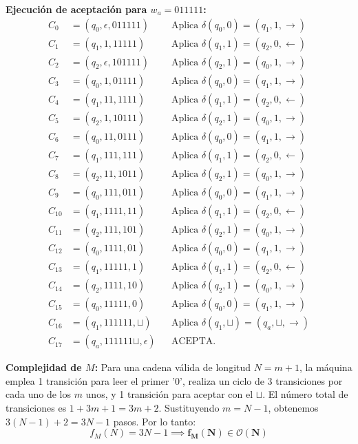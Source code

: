 \vspace{0.3cm}
\noindent\textbf{Ejecución de aceptación para $w_a = 011111$:}
\begin{align*}
    C_0 &= (q_0, \epsilon, 011111) && \text{Aplica } \delta(q_0, 0) = (q_1, 1, \to) \\
    C_1 &= (q_1, 1, 11111) && \text{Aplica } \delta(q_1, 1) = (q_2, 0, \leftarrow) \\
    C_2 &= (q_2, \epsilon, 101111) && \text{Aplica } \delta(q_2, 1) = (q_0, 1, \to) \\
    C_3 &= (q_0, 1, 01111) && \text{Aplica } \delta(q_0, 0) = (q_1, 1, \to) \\
    C_4 &= (q_1, 11, 1111) && \text{Aplica } \delta(q_1, 1) = (q_2, 0, \leftarrow) \\
    C_5 &= (q_2, 1, 10111) && \text{Aplica } \delta(q_2, 1) = (q_0, 1, \to) \\
    C_6 &= (q_0, 11, 0111) && \text{Aplica } \delta(q_0, 0) = (q_1, 1, \to) \\
    C_7 &= (q_1, 111, 111) && \text{Aplica } \delta(q_1, 1) = (q_2, 0, \leftarrow) \\
    C_8 &= (q_2, 11, 1011) && \text{Aplica } \delta(q_2, 1) = (q_0, 1, \to) \\
    C_9 &= (q_0, 111, 011) && \text{Aplica } \delta(q_0, 0) = (q_1, 1, \to) \\
    C_{10} &= (q_1, 1111, 11) && \text{Aplica } \delta(q_1, 1) = (q_2, 0, \leftarrow) \\
    C_{11} &= (q_2, 111, 101) && \text{Aplica } \delta(q_2, 1) = (q_0, 1, \to) \\
    C_{12} &= (q_0, 1111, 01) && \text{Aplica } \delta(q_0, 0) = (q_1, 1, \to) \\
    C_{13} &= (q_1, 11111, 1) && \text{Aplica } \delta(q_1, 1) = (q_2, 0, \leftarrow) \\
    C_{14} &= (q_2, 1111, 10) && \text{Aplica } \delta(q_2, 1) = (q_0, 1, \to) \\
    C_{15} &= (q_0, 11111, 0) && \text{Aplica } \delta(q_0, 0) = (q_1, 1, \to) \\
    C_{16} &= (q_1, 111111, \sqcup) && \text{Aplica } \delta(q_1, \sqcup) = (q_a, \sqcup, \to) \\
    C_{17} &= (q_a, 111111\sqcup, \epsilon) && \text{ACEPTA.}
\end{align*}

\textbf{Complejidad de $M$:} Para una cadena válida de longitud $N = m + 1$, la máquina emplea 1 transición para leer el primer '0', realiza un ciclo de 3 transiciones por cada uno de los $m$ unos, y 1 transición para aceptar con el $\sqcup$. El número total de transiciones es $1 + 3m + 1 = 3m + 2$. Sustituyendo $m = N - 1$, obtenemos $3(N - 1) + 2 = 3N - 1$ pasos. Por lo tanto:
\[ f_M(N) = 3N - 1 \implies \mathbf{f_M(N) \in \mathcal{O}(N)} \]


